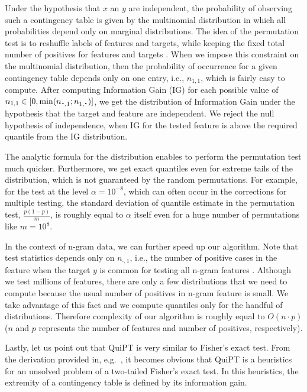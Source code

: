 \documentclass[fleqn,10pt,twoside]{gcb15submission}
\newcommand*{\bigcdot}{\raisebox{-0.25ex}{\scalebox{1.5}{$\cdot$}}}
\begin{document}
  Under the hypothesis that $x$ an $y$ are independent, the probability of 
observing such a contingency table is given by the multinomial distribution in 
which all probabilities depend only on marginal distributions. The idea of the 
permutation test is to reshuffle labels of features and targets, while keeping 
the fixed total number of positives for features and targets . When we impose 
this constraint on the multinomial distribution, then the probability of 
occurrence for a given contingency table depends only on one entry, i.e., 
$n_{1,1}$, which is fairly easy to compute. After computing Information Gain 
(IG) for each possible value of $n_{1,1} \in [0,\min(n_{\bigcdot, 1}; n_{1, 
\bigcdot})]$, we get the distribution of Information Gain under the hypothesis 
that the target and feature are independent. We reject the null hypothesis of 
independence, when IG for the tested feature is above the required quantile from 
the IG distribution.

  The analytic formula for the distribution enables to perform the permutation 
test much quicker. Furthermore, we get exact quantiles even for extreme tails of 
the distribution, which is not guaranteed by the random permutations. For 
example, for the test at the level $\alpha=10^{-8}$, which can often occur in the 
corrections for multiple testing, the standard deviation of quantile estimate in 
the permutation test, $\frac{p(1-p)}{m}$, is roughly equal to $\alpha$ itself even 
for a huge number of permutations like $m=10^8$.

  In the context of n-gram data, we can further speed up our algorithm. Note 
that test statistics depends only on $n_{\cdot, 1}$, i.e., the number of 
positive cases in the feature when the target $y$ is common for testing all 
n-gram features . Although we test millions of features, there are only a few 
distributions that we need to compute because the usual number of positives in 
n-gram feature is small. We take advantage of this fact and we compute quantiles 
only for the handful of distributions. Therefore complexity of our algorithm is 
roughly equal to $O(n\cdot p)$ ($n$ and $p$ represents the number of features and 
number of positives, respectively).

  Lastly, let us point out that QuiPT is very similar to Fisher's exact test. 
From the derivation provided in, e.g.~\citep{lehmann_testing_2008}, it becomes 
obvious that QuiPT is a heuristics for an unsolved problem of a two-tailed 
Fisher's exact test. In this heuristics, the extremity of a contingency table is 
defined by its information gain.
\end{document}
